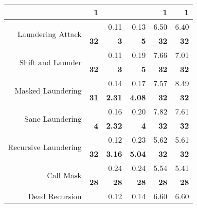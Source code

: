 \begin{figure}
\begin{table}[H]
\begin{tabular}{rr|rr|rr}
                                      & \textbf{1}    &                        &                        & \textbf{1}    & \textbf{1}                  \\ \hline
\multirow{2}{*}{Laundering Attack}    &               & 0.11                   & 0.13                   & 6.50          & 6.40                        \\
                                      & \textbf{32}   & \textbf{3}             & \textbf{5}             & \textbf{32}   & \textbf{32}                 \\ \hline
\multirow{2}{*}{Shift and Launder}    &               & 0.11                   & 0.19                   & 7.66          & 7.01                        \\
                                      & \textbf{32}   & \textbf{3}             & \textbf{5}             & \textbf{32}   & \textbf{32}                \\ \hline
\multirow{2}{*}{Masked Laundering}    &               & 0.14                   & 0.17                   & 7.57          & 8.49                        \\
                                      & \textbf{31}\footnotemark[3]   & \textbf{2.31}          & \textbf{4.08}          & \textbf{32}   & \textbf{32}                 \\ \hline
\multirow{2}{*}{Sane Laundering}      &               & 0.16                   & 0.20                   & 7.82          & 7.61                        \\
                                      & \textbf{4}    & \textbf{2.32}          & \textbf{4}             & \textbf{32}   & \textbf{32}                 \\ \hline\hline
\multirow{2}{*}{Recursive Laundering} &               & 0.12                   & 0.23                   & 5.62          & 5.61                        \\
                                      & \textbf{32}   & \textbf{3.16}          & \textbf{5.04}          & \textbf{32}   & \textbf{32}                \\ \hline
\multirow{2}{*}{Call Mask}            &               & 0.24                   & 0.24                   & 5.54          & 5.41                        \\
                                      & \textbf{28}   & \textbf{28}            & \textbf{28}            & \textbf{28}   & \textbf{28}                 \\ \hline
\multirow{2}{*}{Dead Recursion}\footnotemark[4]       &               & 0.12                   & 0.14                   & 6.60          & 6.60     \\

\end{tabular}
\end{table}
\end{figure}
